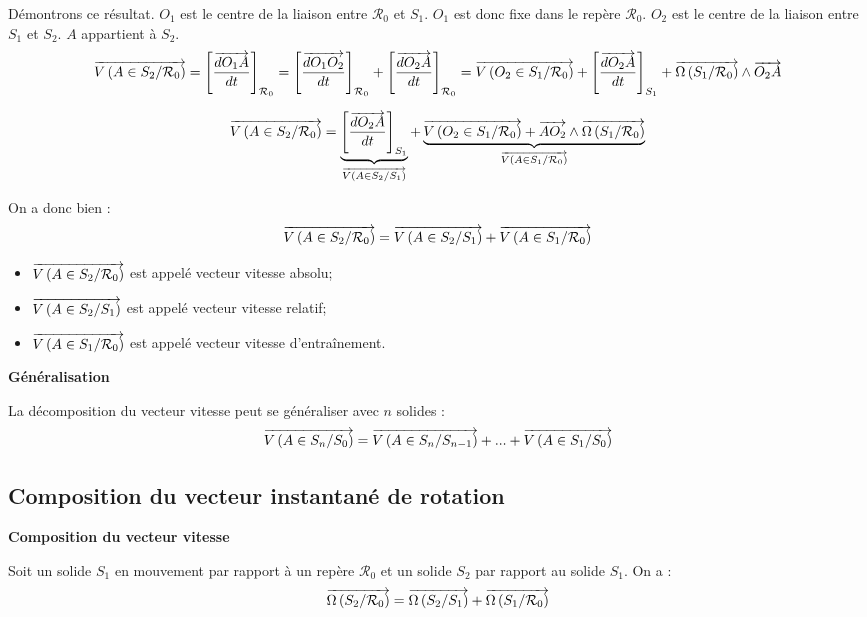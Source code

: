 \documentclass[11pt,oneside]{article}
\begin{document}
Démontrons ce résultat. $O_1$ est le centre de la liaison entre $\mathcal{R}_0$ et $S_1$. $O_1$ est donc fixe dans le repère $\mathcal{R}_0$. $O_2$ est le centre de la liaison entre $S_1$ et $S_2$. $A$ appartient à $S_2$. 
$$
\overrightarrow{V\left( {A} \in {S_2}/{\mathcal{R}_0}\right)}
= \left[\dfrac{\overrightarrow{dO_1 A}}{dt}
\right]_{\mathcal{R}_0}
= \left[\dfrac{\overrightarrow{dO_1 O_2}}{dt}
\right]_{\mathcal{R}_0}
+
\left[\dfrac{\overrightarrow{dO_2 A}}{dt}
\right]_{\mathcal{R}_0}
=
\overrightarrow{V\left( {O_2} \in {S_1}/{\mathcal{R}_0}\right)}
+
\left[\dfrac{\overrightarrow{dO_2 A}}{dt}\right]_{S_1}
+\overrightarrow{\Omega\left( {S_1}/{\mathcal{R}_0}\right)}\wedge \overrightarrow{O_2 A}
$$

$$
\overrightarrow{V\left( {A} \in {S_2}/{\mathcal{R}_0}\right)}
=
\underbrace{\left[\dfrac{\overrightarrow{dO_2 A}}{dt}\right]_{S_1}}_{\overrightarrow{V\left( {A} \in {S_2}/{S_1}\right)}}
+
\underbrace{\overrightarrow{V\left( {O_2} \in {S_1}/{\mathcal{R}_0}\right)}
+
\overrightarrow{AO_2}
\wedge 
\overrightarrow{\Omega\left( {S_1}/{\mathcal{R}_0}\right)}}_{\overrightarrow{V\left( {A} \in {S_1}/{\mathcal{R}_0}\right)}}
$$


On a donc bien : 
$$
\overrightarrow{V\left( {A} \in {S_2}/{\mathcal{R}_0}\right)}
=
\overrightarrow{V\left( {A} \in {S_2}/{S_1}\right)}
+
\overrightarrow{V\left( {A} \in {S_1}/{\mathcal{R}_0}\right)}
$$

\begin{rem}
\begin{itemize}
\item $\overrightarrow{V\left( {A} \in {S_2}/{\mathcal{R}_0}\right)}$ est appelé vecteur vitesse absolu;
\item $\overrightarrow{V\left( {A} \in {S_2}/{S_1}\right)}$ est appelé vecteur vitesse relatif; 
\item $\overrightarrow{V\left( {A} \in {S_1}/{\mathcal{R}_0}\right)}$ est appelé vecteur vitesse d'entraînement.
\end{itemize}
\end{rem}

\begin{resultat}
\textbf{Généralisation}

La décomposition du vecteur vitesse peut se généraliser avec $n$ solides : 
$$
\overrightarrow{V\left( {A} \in {S_n}/{S_0}\right)}
=
\overrightarrow{V\left( {A} \in {S_n}/{S_{n-1}}\right)}
+...+
\overrightarrow{V\left( {A} \in {S_1}/{S_0}\right)}
$$

\end{resultat}

\subsection{Composition du vecteur instantané de rotation}
\begin{resultat}
\textbf{Composition du vecteur vitesse}

Soit un solide $S_1$ en mouvement par rapport à un repère $\mathcal{R}_0$ et un solide $S_2$ par rapport au solide $S_1$. On a : 
$$
\overrightarrow{\Omega\left( {S_2}/{\mathcal{R}_0}\right)}=
\overrightarrow{\Omega\left( {S_2}/{S_1}\right)}+\overrightarrow{\Omega\left( {S_1}/{\mathcal{R}_0}\right)}
$$
\end{resultat}
\end{document}
